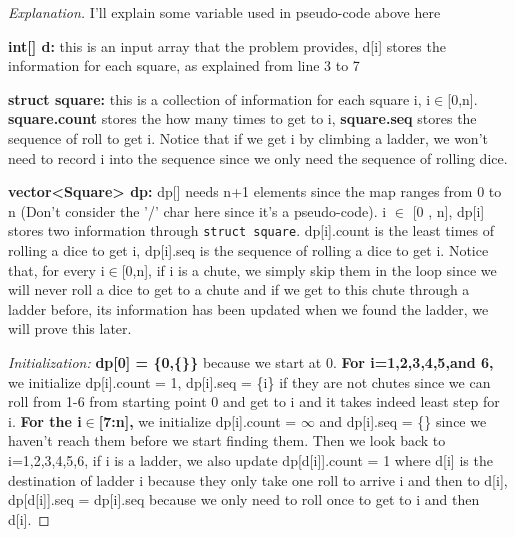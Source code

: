 \documentclass[openany]{article}
\begin{document}
\begin{proof}[Explanation]{}
		\renewcommand{\qedsymbol}{} %
        I'll explain some variable used in pseudo-code above here

        \textbf{int[] d:} this is an input array that the problem provides, d[i] stores the information for each square, as explained from line 3 to 7

        \textbf{struct square:} this is a collection of information for each square i, i$\in$[0,n]. \textbf{square.count} stores the how many times to get to i, \textbf{square.seq} stores the sequence of roll to get i. Notice that if we get i by climbing a ladder, we won't need to record i into the sequence since we only need the sequence of rolling dice.
        
        \textbf{vector<Square> dp:} dp[] needs n+1 elements since the map ranges from 0 to n (Don't consider the '/' char here since it's a pseudo-code). i $\in$ [0 , n], dp[i] stores two information through \texttt{struct square}. dp[i].count is the least times of rolling a dice to get i, dp[i].seq is the sequence of rolling a dice to get i. Notice that, for every i$\in$[0,n], if i is a chute, we simply skip them in the loop since we will never roll a dice to get to a chute and if we get to this chute through a ladder before, its information has been updated when we found the ladder, we will prove this later.
        
        \textit{Initialization:} \textbf{dp[0] = \{0,\{\}\}} because we start at 0. \textbf{For i=1,2,3,4,5,and 6,} we initialize dp[i].count = 1, dp[i].seq = \{i\} if they are not chutes since we can roll from 1-6 from starting point 0 and get to i and it takes indeed least step for i. \textbf{For the i$\in$[7:n],} we initialize dp[i].count = $\infty$ and dp[i].seq = \{\} since we haven't reach them before we start finding them. Then we look back to i=1,2,3,4,5,6, if i is a ladder, we also update dp[d[i]].count = 1 where d[i] is the destination of ladder i because they only take one roll to arrive i and then to d[i], dp[d[i]].seq = dp[i].seq because we only need to roll once to get to i and then d[i].

       
\end{proof}
\end{document}
